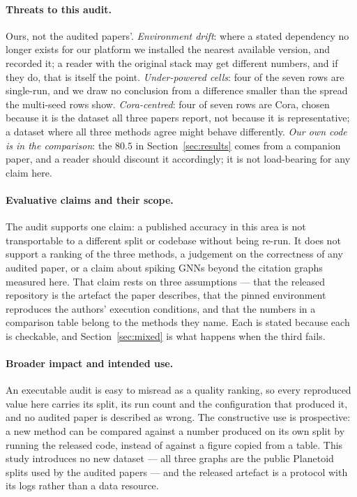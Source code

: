 \documentclass[10pt,twocolumn]{article}
\newcommand{\secref}[1]{Section~\ref{#1}}
\begin{document}
\paragraph{Threats to this audit.} Ours, not the audited papers'. \emph{Environment drift}: where a
stated dependency no longer exists for our platform we installed the nearest available version, and
recorded it; a reader with the original stack may get different numbers, and if they do, that is
itself the point. \emph{Under-powered cells}: four of the seven rows are single-run, and we draw no
conclusion from a difference smaller than the spread the multi-seed rows show. \emph{Cora-centred}:
four of seven rows are Cora, chosen because it is the dataset all three papers report, not because it
is representative; a dataset where all three methods agree might behave differently. \emph{Our own
code is in the comparison}: the $80.5$ in \secref{sec:results} comes from a companion paper, and a
reader should discount it accordingly; it is not load-bearing for any claim here.

\paragraph{Evaluative claims and their scope.} The audit supports one claim: a published accuracy in
this area is not transportable to a different split or codebase without being re-run. It does not
support a ranking of the three methods, a judgement on the correctness of any audited paper, or a
claim about spiking GNNs beyond the citation graphs measured here. That claim rests on three
assumptions --- that the released repository is the artefact the paper describes, that the pinned
environment reproduces the authors' execution conditions, and that the numbers in a comparison table
belong to the methods they name. Each is stated because each is checkable, and \secref{sec:mixed} is
what happens when the third fails.

\paragraph{Broader impact and intended use.} An executable audit is easy to misread as a quality
ranking, so every reproduced value here carries its split, its run count and the configuration that
produced it, and no audited paper is described as wrong. The constructive use is prospective: a new
method can be compared against a number produced on its own split by running the released code,
instead of against a figure copied from a table. This study introduces no new dataset --- all three
graphs are the public Planetoid splits used by the audited papers --- and the released artefact is a
protocol with its logs rather than a data resource.
\end{document}
